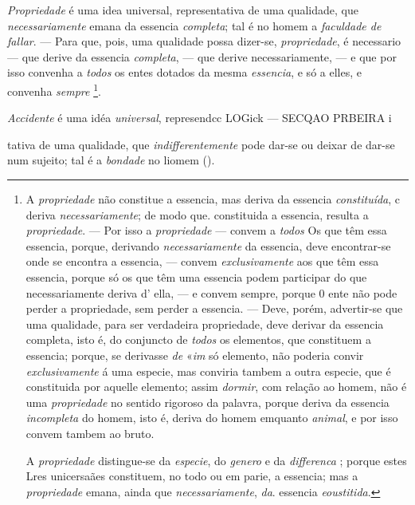  
\emph{Propriedade} é uma idea universal, representativa de uma qualidade, que \emph{necessariamente} emana da essencia \emph{completa}; tal é no homem a \emph{faculdade de fallar}. --- Para que, pois, uma qualidade possa dizer-se, \emph{propriedade}, é necessario --- que derive da essencia \emph{completa}, --- que derive necessariamente, --- e que por isso convenha a \emph{todos} os entes dotados da mesma \emph{essencia}, e só a elles, e convenha \emph{sempre} \footnote{A \emph{propriedade} não constitue a essencia, mas deriva da essencia \emph{constituída}, c deriva \emph{necessariamente}; de modo que. constituida a essencia, resulta a \emph{propriedade}. --- Por isso a \emph{propriedade} --- convem a \emph{todos} Os que têm essa essencia, porque, derivando \emph{necessariamente} da essencia, deve encontrar-se onde se encontra a essencia, --- convem \emph{exclusivamente} aos que têm essa essencia, porque só os que têm uma essencia podem participar do que necessariamente deriva d' ella, --- e convem sempre, porque 0 ente não pode perder a propriedade, sem perder a essencia. --- Deve, porém, advertir-se que uma qualidade, para ser verdadeira propriedade, deve derivar da essencia completa, isto é, do conjuncto de \emph{todos} os elementos, que constituem a essencia; porque, se derivasse \emph{de} «\emph{im} só elemento, não poderia convir \emph{exclusivamente} á uma especie, mas conviria tambem a outra especie, que é constituida por aquelle elemento; assim \emph{dormir}, com relação ao homem, não é uma \emph{propriedade} no sentido rigoroso da palavra, porque deriva da essencia \emph{incompleta} do homem, isto é, deriva do homem emquanto \emph{animal}, e por isso convem tambem ao bruto.\par A \emph{propriedade} distingue-se da \emph{especie}, do \emph{genero} e da \emph{differenca} ; porque estes Lres unicersaães constituem, no todo ou em parie, a essencia; mas a \emph{propriedade} emana, ainda que \emph{necessariamente}, \emph{da}. essencia \emph{eoustitida}.}.


\emph{Accidente} é uma idéa \emph{universal}, represendcc   LOGick --- SECQAO PRBEIRA i

tativa de uma qualidade, que \emph{indifferentemente} pode dar-se ou deixar de dar-se num sujeito; tal é a \emph{bondade} no liomem ().

